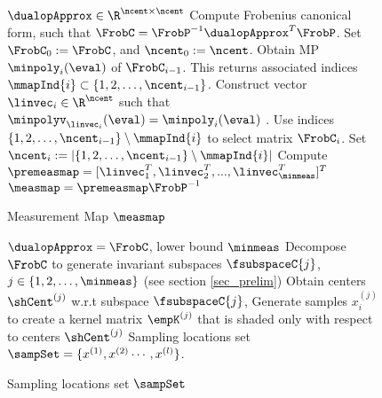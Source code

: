 \begin{figure}[t!]
	\begin{algorithm}[H]
		\caption{Measurement Map $\measmap$}
		\label{alg:measmap}
		\begin{algorithmic}
			\begin{footnotesize} 
				 $\dualopApprox\in\R^{\ncent\times\ncent}$
				\STATE Compute Frobenius canonical form, such that $ \FrobC  = \FrobP^{-1} \dualopApprox^T\FrobP$. Set $\FrobC_0:=\FrobC$, and
				$\ncent_0:=\ncent$. 
				\STATE Obtain MP $\minpoly_i(\eval)$ of $\FrobC_{i-1}$. 
				This returns associated indices $\mmapInd{i}\subset\{1,2,\dots,\ncent_{i-1}\}$. 
				\STATE Construct vector $\linvec_i \in \R^{\ncent}$ such that 
				$\minpolyv_{\linvec_i}(\eval)=\minpoly_{i}(\eval)$ .
				\STATE Use indices $\{1,2,\dots,\ncent_{i-1}\}\setminus\mmapInd{i}$ to select matrix $\FrobC_i$. Set 
				$\ncent_i:= |\{1,2,\dots,\ncent_{i-1}\}\setminus\mmapInd{i}|$
				\ENDFOR
				\STATE Compute $ \premeasmap = [\linvec_1^T, \linvec_2^T,...,\linvec_{\minmeas}^T]^T$
				 $ \measmap =\premeasmap\FrobP^{-1}  $
			\end{footnotesize}
		\end{algorithmic}
	\end{algorithm} 
\end{figure}
\begin{figure}[t!]
	\begin{algorithm}[H]
		\caption{Sampling locations set $ \sampSet $}
		\label{alg:samples}
		\begin{algorithmic}
			\begin{footnotesize}	
				 $ \dualopApprox =\FrobC $, lower bound $\minmeas$
				\STATE Decompose $ \FrobC $ to generate invariant subspaces $ \fsubspaceC{j} $, $ j\in \{1,2,\dots,\minmeas\} $ (see section \ref{sec_prelim})
				\FOR{$j=1$ {\bfseries to} $\minmeas$}
				\STATE Obtain centers $\shCent^{(j)}$ w.r.t subspace $ \fsubspaceC{j} $,
				\STATE Generate samples $x_i^{(j)}$ to create a kernel matrix $\empK^{(j)}$ that is shaded only with respect to centers $\shCent^{(j)}$
				\ENDFOR
				 Sampling locations set  $\sampSet =\{x^{(1)}, x^{(2)}\cdots,x^{(l)}\} $.
			\end{footnotesize}		
		\end{algorithmic}
	\end{algorithm}
\end{figure}
